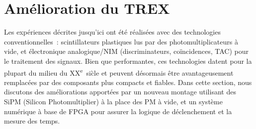 \documentclass[a4paper,12pt,twoside]{article}
\begin{document}
\section{Amélioration du TREX}
Les exp\'eriences d\'ecrites jusqu'ici ont \'et\'e r\'ealis\'ees avec des technologies conventionnelles~: scintillateurs plastiques lus par des photomultiplicateurs \`a vide, et \'electronique analogique/NIM (discriminateurs, co\"incidences, TAC) pour le traitement des signaux. Bien que performantes, ces technologies datent pour la plupart du milieu du XX\textsuperscript{e}~si\`cle et peuvent d\'esormais \^etre avantageusement remplac\'ees par des composants plus compacts et fiables. Dans cette section, nous discutons des am\'eliorations apport\'ees par un nouveau montage utilisant des SiPM (Silicon Photomultiplier) \`a la place des PM \`a vide, et un syst\`eme num\'erique \`a base de FPGA pour assurer la logique de d\'eclenchement et la mesure des temps.
\end{document}
